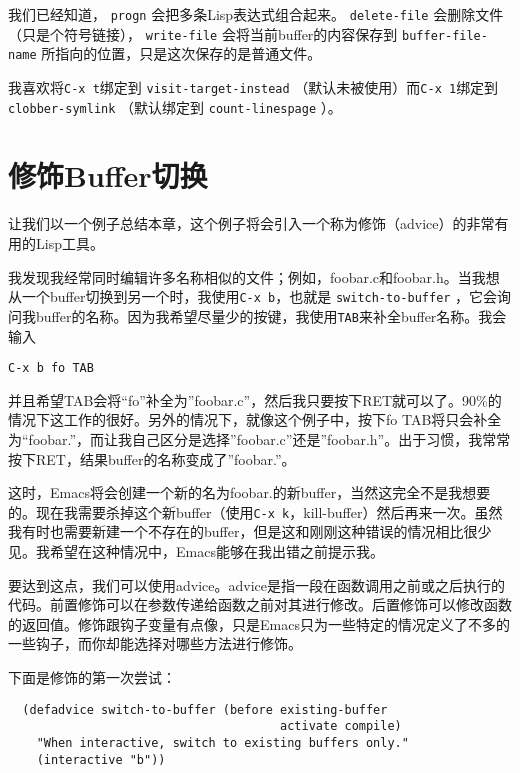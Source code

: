 我们已经知道， \texttt{progn} 会把多条Lisp表达式组合起来。 \texttt{delete-file} 会删除文件（只是个符号链接）， \texttt{write-file} 会将当前buffer的内容保存到 \texttt{buffer-file-name} 所指向的位置，只是这次保存的是普通文件。

我喜欢将\verb|C-x t|绑定到 \texttt{visit-target-instead} （默认未被使用）而\verb|C-x 1|绑定到 \texttt{clobber-symlink} （默认绑定到 \texttt{count-linespage} ）。

\section{修饰Buffer切换}
\label{section:02-Advised-Buffer-Switching}

让我们以一个例子总结本章，这个例子将会引入一个称为修饰（advice）的非常有用的Lisp工具。

我发现我经常同时编辑许多名称相似的文件；例如，foobar.c和foobar.h。当我想从一个buffer切换到另一个时，我使用\verb|C-x b|，也就是 \texttt{switch-to-buffer} ，它会询问我buffer的名称。因为我希望尽量少的按键，我使用\verb|TAB|来补全buffer名称。我会输入

\begin{verbatim}
C-x b fo TAB
\end{verbatim}

并且希望TAB会将“fo”补全为”foobar.c”，然后我只要按下RET就可以了。90\%的情况下这工作的很好。另外的情况下，就像这个例子中，按下fo TAB将只会补全为“foobar.”，而让我自己区分是选择”foobar.c”还是”foobar.h”。出于习惯，我常常按下RET，结果buffer的名称变成了”foobar.”。

这时，Emacs将会创建一个新的名为foobar.的新buffer，当然这完全不是我想要的。现在我需要杀掉这个新buffer（使用\verb|C-x k|，kill-buffer）然后再来一次。虽然我有时也需要新建一个不存在的buffer，但是这和刚刚这种错误的情况相比很少见。我希望在这种情况中，Emacs能够在我出错之前提示我。

要达到这点，我们可以使用advice。advice是指一段在函数调用之前或之后执行的代码。前置修饰可以在参数传递给函数之前对其进行修改。后置修饰可以修改函数的返回值。修饰跟钩子变量有点像，只是Emacs只为一些特定的情况定义了不多的一些钩子，而你却能选择对哪些方法进行修饰。

下面是修饰的第一次尝试：

\begin{verbatim}
  (defadvice switch-to-buffer (before existing-buffer
                                      activate compile)
    "When interactive, switch to existing buffers only."
    (interactive "b"))
\end{verbatim}

